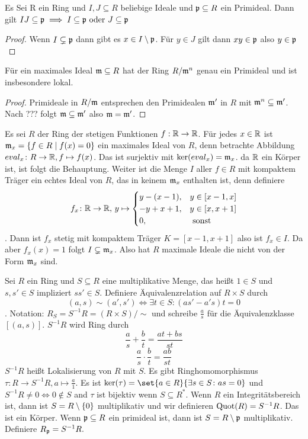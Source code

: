 \begin{Lemma}
    Es Sei R ein Ring und $I,J\subseteq R$ beliebige Ideale und $\mathfrak{p}\subseteq R$ ein Primideal. Dann gilt 
    $IJ\subseteq \mathfrak{p}\implies I\subseteq\mathfrak{p} \text{ oder } J\subseteq\mathfrak{p}$
\end{Lemma}
\begin{proof}
    Wenn $I\subsetneq \mathfrak{p}$ dann gibt es $x\in I\setminus\mathfrak{p}$. Für $y\in J$ gilt dann $xy\in\mathfrak{p}$ also $y\in\mathfrak{p}$
\end{proof}
\begin{Kor}
    Für ein maximales Ideal $\mathfrak{m}\subseteq R$ hat der Ring $R/\mathfrak{m}^n$ genau ein Primideal und ist insbesondere lokal.
\end{Kor}
\begin{proof}
    Primideale in $R/\mathfrak{m}$ entsprechen den Primidealen $\mathfrak{m}'$ in $R$ mit $\mathfrak{m}^n\subseteq \mathfrak{m}'$. Nach ??? folgt $\mathfrak{m}\subseteq \mathfrak{m}'$ also $\mathfrak{m}=\mathfrak{m}'$. 
\end{proof}
\begin{Bsp}
    Es sei $R$ der Ring der stetigen Funktionen $f:\mathbb{R}\to \mathbb{R}$. Für jedes $x\in \mathbb{R}$ ist $\mathfrak{m}_x=\{f\in R\mid f(x)=0\}$ ein maximales Ideal von $R$, denn betrachte Abbildung $eval_x\colon R\to \mathbb{R}, f\mapsto f(x)$. Das ist surjektiv mit $\ker(eval_x)=\mathfrak{m}_x$. da $\mathbb{R}$ ein Körper ist, ist folgt die Behauptung.
    Weiter ist die Menge $I$ aller $f\in R$ mit kompaktem Träger ein echtes Ideal von $R$, das in keinem $\mathfrak{m}_x$ enthalten ist, denn definiere $$f_x\colon \mathbb{R}\to \mathbb{R},\, y\mapsto \begin{cases}
        y-(x-1), & y\in[x-1,x]\\
        -y+x+1, & y\in [x,x+1]\\
        0, & \text{ sonst }
    \end{cases}$$. Dann ist $f_x$ stetig mit kompaktem Träger $K=[x-1,x+1]$ also ist $f_x\in I$. Da aber $f_x(x)=1$ folgt $I\subsetneq \mathfrak{m}_x$. Also hat $R$ maximale Ideale die nicht von der Form $\mathfrak{m}_x$ sind.
\end{Bsp}
\begin{Def}
    Sei $R$ ein Ring und $S\subseteq R$ eine multiplikative Menge, das heißt $1\in S$ und $s,s'\in S$ impliziert $ss'\in S$.
    Definiere Äquivalenzrelation auf $R\times S$ durch $$(a,s)\sim (a',s')\iff \exists t\in S\colon (as'-a's)t=0$$. Notation: $R_S=S^{-1}R=(R\times S)/\sim$ und schreibe $\frac a s$ für die Äquivalenzklasse $[(a,s)]$.
    $S^{-1}R$ wird Ring durch 
    $$\frac a s+\frac b t=\frac{at+bs}{st}$$
    $$\frac a s\cdot \frac b t=\frac{ab}{st}$$
    $S^{-1}R$ heißt Lokalisierung von $R$ mit $S$.
    Es gibt Ringhomomorphismus $\tau:R\to S^{-1}R,a\mapsto \frac a 1$.
    Es ist $\ker(\tau)=\set{ a\in R}{\exists s\in S\colon as=0}$ und $S^{-1}R\neq 0 \iff 0\not\in S$ and $\tau $ ist bijektiv wenn $S\subseteq R^*$.
    Wenn $R$ ein Integritätsbereich ist, dann ist $S=R\setminus\{0\}$ multiplikativ und wir definieren $\operatorname{Quot}(R)=S^{-1}R$. Das ist ein Körper.
    Wenn $\mathfrak{p}\subseteq R$ ein primideal ist, dann ist $S=R\setminus\mathfrak{p}$ multiplikativ. Definiere $R_{\mathfrak{p}}=S^{-1}R.$
\end{Def}
